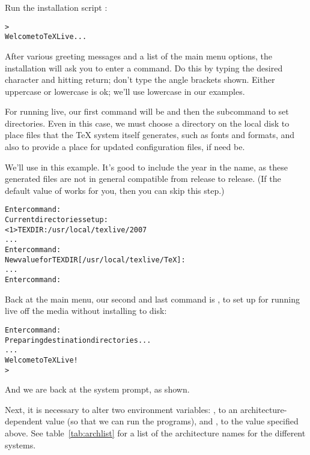 \documentclass{article}
\begin{document}
\def\installtlsh{
Run the installation script \filename{install-tl.sh}:
\begin{alltt}
> \Ucom{sh install-tl.sh}\\
Welcome to TeX Live...
\end{alltt}

\noindent After various greeting messages and a list of the main menu
options, the installation will ask you to enter a command.  Do this by
typing the desired character and hitting return; don't type the angle
brackets shown.  Either uppercase or lowercase is ok; we'll use
lowercase in our examples.
}

\runlive
\startinst
\installtlsh

For running live, our first command will be  and then the
subcommand  to set directories.  Even in this case, we must
choose a directory on the local disk to place files that the \TeX{}
system itself generates, such as fonts and formats, and also to provide
a place for updated configuration files, if need be.

We'll use  in this example.  It's good to
include the year in the name, as these generated files are not
in general compatible from release to release.  (If the default value of
 works for you, then you can skip this
step.)

\begin{alltt}
Enter command: 
Current directories setup:
<1>  TEXDIR:     /usr/local/texlive/2007
...
Enter command: 
New value for TEXDIR [/usr/local/texlive/TeX]: 
...
Enter command: 
\end{alltt}

\noindent Back at the main menu, our second and last command is
, to set up for running live off the media without installing
to disk:
\begin{alltt}
Enter command: 
Preparing destination directories...
...
Welcome to TeX Live!
>
\end{alltt}

\noindent And we are back at the system prompt, as shown.

Next, it is necessary to alter two environment variables:
, to an architecture-dependent value (so that we can run
the programs), and , to the value specified above.
See table~\ref{tab:archlist} for a list of the architecture names for
the different systems.
\end{document}
